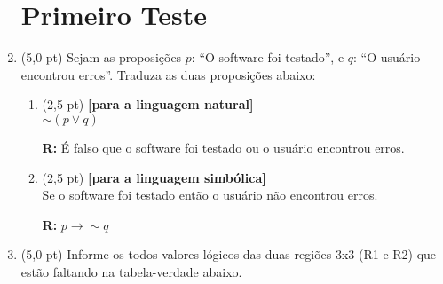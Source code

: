 \documentclass[12pt,a4paper,oneside]{article}
\begin{document}
\begin{enumerate}
	
	\section*{Primeiro Teste}
	
	\item (5,0 pt) Sejam as proposições $p$: ``O software foi testado'', e $q$: ``O usuário encontrou erros''. Traduza as duas proposições abaixo:
	\begin{enumerate}
		\item (2,5 pt) {\bf [para a linguagem natural]} \\$\sim (p \vee q)$
		\vspace*{0.3cm}
		
		{\color{blue} {\bf R:} É falso que o software foi testado ou o usuário encontrou erros.\\
		}
		
		\item (2,5 pt) {\bf [para a linguagem simbólica]} \\Se o software foi testado então o usuário não encontrou erros.
		\vspace*{0.3cm}
		
		{\color{blue} {\bf R:} $p \rightarrow \sim q$
		}
	\end{enumerate}
	
	\newpage
	
	\item (5,0 pt) Informe os todos valores lógicos das duas regiões 3x3 (R1 e R2) que estão faltando na tabela-verdade abaixo.
	

\end{enumerate}
\end{document}
